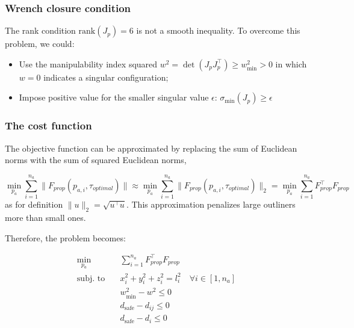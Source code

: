 \subsubsection{Wrench closure condition}
The rank condition $\text{rank}(J_p) = 6$ is not a smooth inequality. To overcome this problem, we could: 

\begin{itemize}
    \item Use the manipulability index squared $w^2=\det(J_p J_p^\top)\ge w_{\text{min}}^2>0$ in which $w=0$ indicates a singular configuration;
    \item Impose positive value for the smaller singular value $\epsilon$: $\sigma_{\text{min}}(J_p) \ge \epsilon$
\end{itemize}


\subsubsection{The cost function}
The objective function can be approximated by replacing the sum of Euclidean norms with the sum of squared Euclidean norms,

\begin{equation}
    \min_{p_a}\sum_{i=1}^{n_a}\|F_{prop}(p_{a, i}, \tau_{optimal})\| \approx \min_{p_a}\sum_{i=1}^{n_a}\|F_{prop}(p_{a, i}, \tau_{optimal})\|_2 = \min_{p_a}\sum_{i=1}^{n_a}F_{prop}^\top F_{prop}
\end{equation}
as for definition $\|u\|_2 = \sqrt{u^\top u}$. This approximation penalizes large outliners more than small ones.

Therefore, the problem becomes:

\begin{equation}
      \begin{aligned}
        \min_{p_a} \quad & \sum_{i=1}^{n_a}F_{prop}^\top F_{prop}\\
        \text{subj. to} \quad 
        & x_i^2 + y_i^2 + z_i^2 = l_i^2 \quad \forall i \in [1, n_a]\\
        & w_{\text{min}}^2 - w^2 \le 0\\
        & d_{\text{safe}} - d_{ij} \le 0 \\
        & d_{\text{safe}} - d_{i} \le 0 \\
    \end{aligned}
\end{equation}
